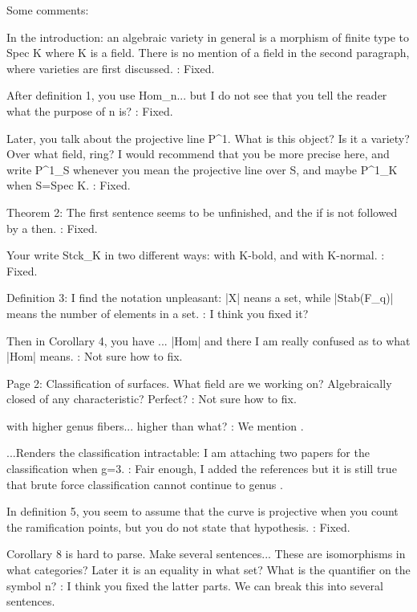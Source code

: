 Some comments:



In the introduction: an algebraic variety in general is a morphism of finite type to Spec K where K is a field. There is no mention of a field in the second paragraph, where varieties are first discussed. : Fixed.



After definition 1, you use
Hom_n...
but I do not see that you tell the reader what the purpose of n is? : Fixed.



Later, you talk about the projective line P^1. What is this object? Is it a variety? Over what field, ring? I would recommend that you be more precise here, and write P^1_S whenever you mean the projective line over S, and maybe P^1_K when S=Spec K. : Fixed.



Theorem 2: The first sentence seems to be unfinished, and the if is not followed by a then. : Fixed.



Your write Stck_K in two different ways: with K-bold, and with K-normal. : Fixed.



Definition 3: I find the notation unpleasant:
|X| neans a set, while |Stab(F_q)| means the number of elements in a set. : I think you fixed it?



Then in Corollary 4, you have
... \leq |Hom| \leq
and there I am really confused as to what
|Hom| means. : Not sure how to fix.



Page 2:  Classification of surfaces. What field are we working on? Algebraically closed of any characteristic? Perfect? : Not sure how to fix.


with higher genus fibers... higher than what? : We mention .



...Renders the classification intractable: I am attaching two papers for the classification when g=3. : Fair enough, I added the references but it is still true that brute force classification cannot continue to genus .



In definition 5, you seem to assume that the curve is projective when you count the ramification points, but you do not state that hypothesis. : Fixed.



Corollary 8 is hard to parse. Make several sentences...
These are isomorphisms in what categories? Later it is an equality in what set? What is the quantifier on the symbol n? : I think you fixed the latter parts. We can break this into several sentences.



